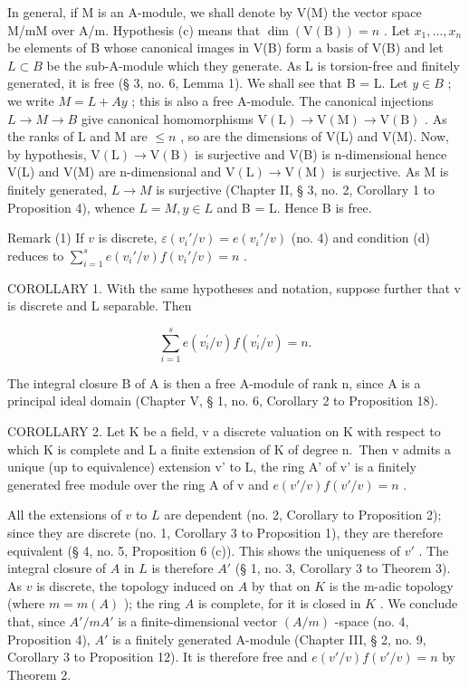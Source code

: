 In general, if M is an A-module, we shall denote by V(M) the vector space M/mM over A/m. Hypothesis (c) means that \(\dim(\mathrm{V}(\mathrm{B})) = n\) . Let \(x_{1}, \ldots, x_{n}\) be elements of B whose canonical images in V(B) form a basis of V(B) and let \(L \subset B\) be the sub-A-module which they generate. As L is torsion-free and finitely generated, it is free (§ 3, no. 6, Lemma 1). We shall see that B = L. Let \(y \in B\) ; we write \(M = L + Ay\) ; this is also a free A-module. The canonical injections \(L \to M \to B\) give canonical homomorphisms \(\mathrm{V}(\mathrm{L}) \to \mathrm{V}(\mathrm{M}) \to \mathrm{V}(\mathrm{B})\) . As the ranks of L and M are \(\leqslant n\) , so are the dimensions of V(L) and V(M). Now, by hypothesis, \(\mathrm{V}(\mathrm{L}) \to \mathrm{V}(\mathrm{B})\) is surjective and V(B) is n-dimensional hence V(L) and V(M) are n-dimensional and \(\mathrm{V}(\mathrm{L}) \to \mathrm{V}(\mathrm{M})\) is surjective. As M is finitely generated, \(L \to M\) is surjective (Chapter II, § 3, no. 2, Corollary 1 to Proposition 4), whence \(L = M, y \in L\) and B = L. Hence B is free.

Remark (1) If \(v\) is discrete, \(\varepsilon(v_i'/v) = e(v_i'/v)\) (no. 4) and condition (d) reduces to \(\sum_{i=1}^{s} e(v_i'/v)f(v_i'/v) = n\) .

COROLLARY 1. With the same hypotheses and notation, suppose further that v is discrete and L separable. Then

\[
\sum_ {i = 1} ^ {s} e (v _ {i} ^ {\prime} / v) f (v _ {i} ^ {\prime} / v) = n.
\]

The integral closure B of A is then a free A-module of rank n, since A is a principal ideal domain (Chapter V, § 1, no. 6, Corollary 2 to Proposition 18).

COROLLARY 2. Let K be a field, v a discrete valuation on K with respect to which K is complete and L a finite extension of K of degree n.~Then v admits a unique (up to equivalence) extension v' to L, the ring A' of v' is a finitely generated free module over the ring A of v and \(e(v'/v)f(v'/v)=n\) .

All the extensions of \(v\) to \(L\) are dependent (no. 2, Corollary to Proposition 2); since they are discrete (no. 1, Corollary 3 to Proposition 1), they are therefore equivalent (§ 4, no. 5, Proposition 6 (c)). This shows the uniqueness of \(v'\) . The integral closure of \(A\) in \(L\) is therefore \(A'\) (§ 1, no. 3, Corollary 3 to Theorem 3). As \(v\) is discrete, the topology induced on \(A\) by that on \(K\) is the m-adic topology (where \(m = m(A)\) ); the ring \(A\) is complete, for it is closed in \(K\) . We conclude that, since \(A'/mA'\) is a finite-dimensional vector \((A/m)\) -space (no. 4, Proposition 4), \(A'\) is a finitely generated A-module (Chapter III, § 2, no. 9, Corollary 3 to Proposition 12). It is therefore free and \(e(v'/v)f(v'/v) = n\) by Theorem 2.

